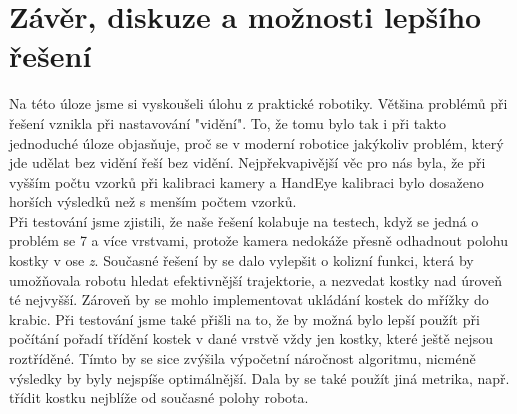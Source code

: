 \documentclass[journal,twoside,web]{ieeecolor}
\begin{document}
    \section{Závěr, diskuze a možnosti lepšího řešení}
        Na této úloze jsme si vyskoušeli úlohu z praktické robotiky. Většina problémů při řešení vznikla při nastavování "vidění".
        To, že tomu bylo tak i při takto jednoduché úloze objasňuje, proč se v moderní robotice jakýkoliv problém, který jde udělat bez vidění
        řeší bez vidění. Nejpřekvapivější věc pro nás byla, že při vyšším počtu vzorků při kalibraci kamery a HandEye kalibraci bylo dosaženo
        horších výsledků než s menším počtem vzorků.\\
        Při testování jsme zjistili, že naše řešení kolabuje na testech, když se jedná o problém se 7 a více vrstvami,
        protože kamera nedokáže přesně odhadnout polohu kostky v ose \textit{z}.
        Současné řešení by se dalo vylepšit o kolizní funkci, která by umožňovala robotu hledat efektivnější trajektorie, a nezvedat kostky
        nad úroveň té nejvyšší. Zároveň by se mohlo implementovat ukládání kostek do mřížky do krabic. Při testování jsme také přišli na to,
        že by možná bylo lepší použít při počítání pořadí třídění kostek v dané vrstvě vždy jen kostky, které ještě nejsou roztříděné.
        Tímto by se sice zvýšila výpočetní náročnost algoritmu, nicméně výsledky by byly nejspíše optimálnější. Dala by se také použít jiná metrika,
        např. třídit kostku nejblíže od současné polohy robota.
\end{document}
